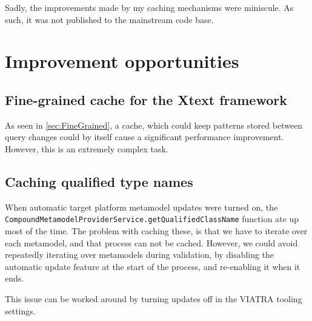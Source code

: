 \documentclass[11pt,a4paper,oneside]{report}
\begin{document}
Sadly, the improvements made by my caching mechanisms were miniscule. As such,
it was not published to the mainstream code base.

\section{Improvement opportunities}

\subsection{Fine-grained cache for the Xtext framework}
As seen in \ref{sec:FineGrained}, a cache, which could keep patterns stored
between query changes could by itself cause a significant performance
improvement. However, this is an extremely complex task.

\subsection{Caching qualified type names}
When automatic target platform metamodel updates were turned on, the
\texttt{CompoundMetamodelProviderService.getQualifiedClassName} function ate up
most of the time. The problem with caching these, is that we have to iterate
over each metamodel, and that process can not be cached. However, we could avoid
repeatedly iterating over metamodels during validation, by disabling the
automatic update feature at the start of the process, and re-enabling it when it
ends.

This issue can be worked around by turning updates off in the VIATRA tooling
settings.


\listoffigures{}
\listoftables{}

\label{page:last}
\end{document}
